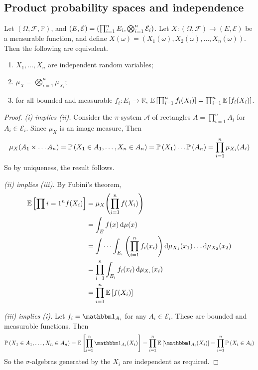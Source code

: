 \subsection{Product probability spaces and independence}
\begin{proposition}
	Let \( (\Omega, \mathcal F, \mathbb P) \), and \( (E, \mathcal E) = \qty(\prod_{i=1}^n E_i, \bigotimes_{i=1}^n \mathcal E_i) \).
	Let \( X \colon (\Omega, \mathcal F) \to (E, \mathcal E) \) be a measurable function, and define \( X(\omega) = (X_1(\omega), X_2(\omega), \dots, X_n(\omega)) \).
	Then the following are equivalent.
	\begin{enumerate}
		\item \( X_1, \dots, X_n \) are independent random variables;
		\item \( \mu_X = \bigotimes_{i=1}^n \mu_{X_i} \);
		\item for all bounded and measurable \( f_i \colon E_i \to \mathbb R \), \( \mathbb{E}\left[{\prod_{i=1}^n f_i(X_i)}\right] = \prod_{i=1}^n \mathbb{E}\left[{f_i(X_i)}\right] \).
	\end{enumerate}
\end{proposition}
\begin{proof}
	\emph{(i) implies (ii).}
	Consider the \( \pi \)-system \( \mathcal A \) of rectangles \( A = \prod_{i=1}^n A_i \) for \( A_i \in \mathcal E_i \).
	Since \( \mu_X \) is an image measure,
	Then
	\[ \mu_X(A_1 \times \dots A_n) = \mathbb{P}\left({X_1 \in A_1, \dots, X_n \in A_n}\right) = \mathbb{P}\left({X_1}\right) \dots \mathbb{P}\left({A_n}\right) = \prod_{i=1}^n \mu_{X_i}(A_i) \]
	So by uniqueness, the result follows.

	\emph{(ii) implies (iii).}
	By Fubini's theorem,
	\begin{align*}
		\mathbb{E}\left[{\prod{i=1}^n f(X_i)}\right] &= \mu_X\qty(\prod_{i=1}^n f(X_i)) \\
		&= \int_E f(x) \dd{\mu(x)} \\
		&= \idotsint_{E_i} \qty(\prod_{i=1}^n f_i(x_i)) \dd{\mu_{X_1}(x_1)} \dots \dd{\mu_{X_2}(x_2)} \\
		&= \prod_{i=1}^n \int_{E_i} f_i(x_i) \dd{\mu_{X_i}(x_i)} \\
		&= \prod_{i=1}^n \mathbb{E}\left[{f(X_i)}\right]
	\end{align*}

	\emph{(iii) implies (i).}
	Let \( f_i = \mathbbm 1_{A_i} \) for any \( A_i \in \mathcal E_i \).
	These are bounded and measurable functions.
	Then
	\[ \prob{X_1 \in A_1, \dots, X_n \in A_n} = \expect{\prod_{i=1}^n \mathbbm 1_{A_i}(X_i)} = \prod_{i=1}^n \expect{\mathbbm 1_{A_i}(X_i)} = \prod_{i=1}^n \prob{X_i \in A_i} \]
	So the \( \sigma \)-algebras generated by the \( X_i \) are independent as required.
\end{proof}
